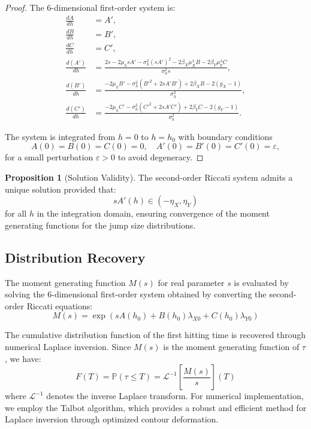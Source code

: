 \documentclass{article}
\renewcommand{\P}{\mathbb{P}}
\theoremstyle{definition}
\newtheorem{proposition}{Proposition}[section]
\begin{document}
\begin{proof}
The 6-dimensional first-order system is:
\begin{align}
\frac{dA}{dh} &= A', \\
\frac{dB}{dh} &= B', \\
\frac{dC}{dh} &= C', \\
\frac{d(A')}{dh} &= \frac{2s - 2\mu_h s A' - \sigma_h^2 (s A')^2 - 2\beta_X \mu_X^\lambda B - 2\beta_Y \mu_Y^\lambda C}{\sigma_h^2 s}, \\
\frac{d(B')}{dh} &= \frac{-2\mu_h B' - \sigma_h^2(B'^2 + 2 s A' B') + 2 \beta_X B - 2(g_X - 1)}{\sigma_h^2}, \\
\frac{d(C')}{dh} &= \frac{-2\mu_h C' - \sigma_h^2(C'^2 + 2 s A' C') + 2 \beta_Y C - 2(g_Y - 1)}{\sigma_h^2}.
\end{align}

The system is integrated from $h = 0$ to $h = h_0$ with boundary conditions
\[
A(0) = B(0) = C(0) = 0, \quad A'(0) = B'(0) = C'(0) = \varepsilon,
\]
for a small perturbation $\varepsilon > 0$ to avoid degeneracy.
\end{proof}

\begin{proposition}[Solution Validity]
\label{prop:mgf_validity}
The second-order Riccati system admits a unique solution provided that:
\begin{equation}
s A'(h) \in (-\eta_X, \eta_Y) \label{eq:mgf_validity_condition}
\end{equation}
for all $h$ in the integration domain, ensuring convergence of the moment generating functions for the jump size distributions.
\end{proposition}

\subsection{Distribution Recovery}

The moment generating function $M(s)$ for real parameter $s$ is evaluated by solving the 6-dimensional first-order system obtained by converting the second-order Riccati equations:
\begin{equation}
M(s) = \exp\!\left( s A(h_0) + B(h_0)\lambda_{X0} + C(h_0)\lambda_{Y0} \right)
\end{equation}

The cumulative distribution function of the first hitting time is recovered through numerical Laplace inversion. Since $M(s)$ is the moment generating function of $\tau$, we have:
\begin{equation}
F(T) = \P(\tau \leq T) = \mathcal{L}^{-1}\left[\frac{M(s)}{s}\right](T) \label{eq:laplace_inversion}
\end{equation}
where $\mathcal{L}^{-1}$ denotes the inverse Laplace transform. For numerical implementation, we employ the Talbot algorithm, which provides a robust and efficient method for Laplace inversion through optimized contour deformation.
\end{document}
